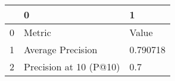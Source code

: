 \begin{tabular}{lll}
\toprule
{} &                       0 &         1 \\
\midrule
0 &                  Metric &     Value \\
1 &       Average Precision &  0.790718 \\
2 &  Precision at 10 (P@10) &       0.7 \\
\bottomrule
\end{tabular}
